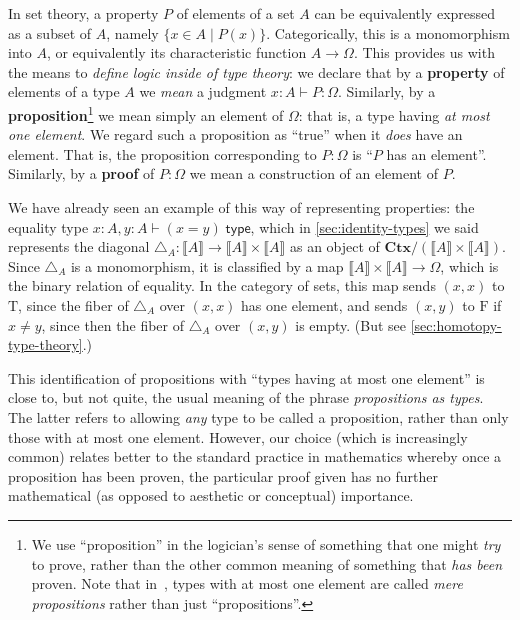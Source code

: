 \documentclass[12pt]{article}
\def\ty{\;\mathsf{type}}
\def\m#1{\llbracket#1\rrbracket}
\def\types{\vdash}
\def\true{\mathrm{T}}
\def\false{\mathrm{F}}
\def\diag{\triangle}
\def\Ctx{\mathbf{Ctx}}
\numberwithin{equation}{section}
\begin{document}

In set theory, a property $P$ of elements of a set $A$ can be equivalently expressed as a subset of $A$, namely $\{ x\in A \mid P(x) \}$.
Categorically, this is a monomorphism into $A$, or equivalently its characteristic function $A\to\Omega$.
This provides us with the means to \emph{define logic inside of type theory}: we declare that by a \textbf{property} of elements of a type $A$ we \emph{mean} a judgment $x:A \types P:\Omega$.
Similarly, by a \textbf{proposition}\footnote{We use ``proposition'' in the logician's sense of something that one might \emph{try} to prove, rather than the other common meaning of something that \emph{has been} proven.
  Note that in~\cite{hottbook}, types with at most one element are called \emph{mere propositions} rather than just ``propositions''.}
we mean simply an element of $\Omega$: that is, a type having \emph{at most one element}.
We regard such a proposition as ``true'' when it \emph{does} have an element.
That is, the proposition corresponding to $P:\Omega$ is ``$P$ has an element''.
Similarly, by a \textbf{proof} of $P:\Omega$ we mean a construction of an element of $P$.

We have already seen an example of this way of representing properties: the equality type $x:A,y:A \types (x=y)\ty$, which
in \cref{sec:identity-types} we said represents the diagonal $\diag_A : \m A \to \m A \times \m A$ as an object of $\Ctx/(\m A \times \m A)$.
Since $\diag_A$ is a monomorphism, it is classified by a map $\m A \times \m A \to \Omega$, which is the binary relation of equality.
In the category of sets, this map sends $(x,x)$ to $\true$, since the fiber of $\diag_A$ over $(x,x)$ has one element, and sends $(x,y)$ to $\false$ if $x\neq y$, since then the fiber of $\diag_A$ over $(x,y)$ is empty.
(But see \cref{sec:homotopy-type-theory}.)

This identification of propositions with ``types having at most one element'' is close to, but not quite, the usual meaning of the phrase \emph{propositions as types}.
The latter refers to allowing \emph{any} type to be called a proposition, rather than only those with at most one element.
However, our choice (which is increasingly common) relates better to the standard practice in mathematics whereby once a proposition has been proven, the particular proof given has no further mathematical (as opposed to aesthetic or conceptual) importance.
\end{document}
